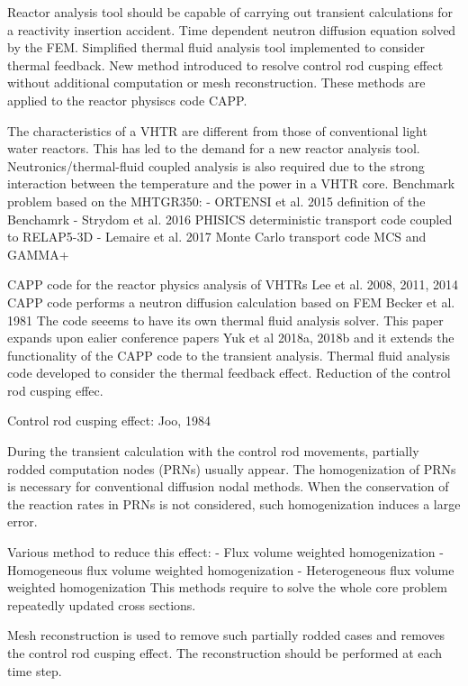 
Reactor analysis tool should be capable of carrying out transient calculations for a reactivity insertion accident.
Time dependent neutron diffusion equation solved by the FEM.
Simplified thermal fluid analysis tool implemented to consider thermal feedback.
New method introduced to resolve control rod cusping effect without additional computation or mesh reconstruction.
These methods are applied to the reactor physiscs code CAPP.

The characteristics of a VHTR are different from those of conventional light water reactors.
This has led to the demand for a new reactor analysis tool.
Neutronics/thermal-fluid coupled analysis is also required due to the strong interaction between the temperature and the power in a VHTR core.
Benchmark problem based on the MHTGR350:
- ORTENSI et al. 2015
definition of the Benchamrk
- Strydom et al. 2016
PHISICS deterministic transport code coupled to RELAP5-3D
- Lemaire et al. 2017
Monte Carlo transport code MCS and GAMMA+

CAPP code for the reactor physics analysis of VHTRs
Lee et al. 2008, 2011, 2014
CAPP code performs a neutron diffusion calculation based on FEM
Becker et al. 1981
The code seeems to have its own thermal fluid analysis solver.
This paper expands upon ealier conference papers
Yuk et al 2018a, 2018b
and it extends the functionality of the CAPP code to the transient analysis.
Thermal fluid analysis code developed to consider the thermal feedback effect.
Reduction of the control rod cusping effec.

Control rod cusping effect:
Joo, 1984 %

During the transient calculation with the control rod movements, partially rodded computation nodes (PRNs) usually appear.
The homogenization of PRNs is necessary for conventional diffusion nodal methods.
When the conservation of the reaction rates in PRNs is not considered, such homogenization induces a large error.

Various method to reduce this effect:
- Flux volume weighted homogenization
- Homogeneous flux volume weighted homogenization
- Heterogeneous flux volume weighted homogenization
This methods require to solve the whole core problem repeatedly updated cross sections.

Mesh reconstruction is used to remove such partially rodded cases and removes the control rod cusping effect.
The reconstruction should be performed at each time step.


